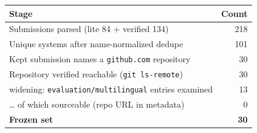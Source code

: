 \begin{tabular}{lr}
\toprule
Stage & Count \\
\midrule
Submissions parsed (lite 84 + verified 134) & 218 \\
Unique systems after name-normalized dedupe & 101 \\
Kept submission names a \texttt{github.com} repository & 30 \\
Repository verified reachable (\texttt{git ls-remote}) & 30 \\
\quad widening: \texttt{evaluation/multilingual} entries examined & 13 \\
\quad \dots{} of which sourceable (repo URL in metadata) & 0 \\
\midrule \textbf{Frozen set} & \textbf{30} \\
\bottomrule
\end{tabular}
